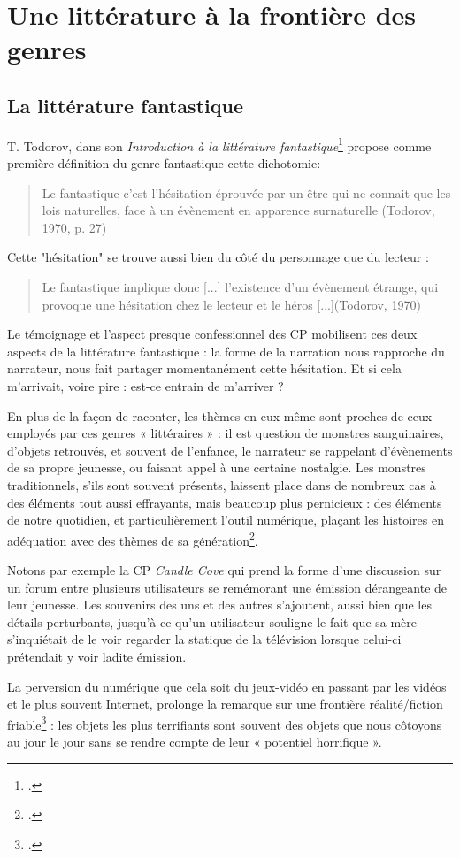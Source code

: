 \documentclass[12pt,a4paper,oneside,titlepage]{book} %
\begin{document}
\section{Une littérature à la frontière des genres}
\subsection{La littérature fantastique}

T. Todorov, dans son \emph{Introduction à la littérature fantastique}\footcite{todorov_introduction_1992} propose comme première définition du genre fantastique cette dichotomie: 

	\begin{quotation}
Le fantastique c’est l’hésitation éprouvée par un être qui ne connait que les lois naturelles, face à un évènement en apparence surnaturelle (Todorov, 1970, p. 27)\newline
	\end{quotation}

Cette "hésitation" se trouve aussi bien du côté du personnage que du lecteur : 
\begin{quotation}
	Le fantastique implique donc [...] l’existence d’un évènement étrange, qui provoque une hésitation chez le lecteur et le héros [...](Todorov, 1970)
\end{quotation}

Le témoignage et l'aspect presque confessionnel des CP mobilisent ces deux aspects de la littérature fantastique : la forme de la narration nous rapproche du narrateur, nous fait partager momentanément cette hésitation. Et si cela m'arrivait, voire pire : est-ce entrain de m'arriver ? 

\par
En plus de la façon de raconter, les thèmes en eux même sont proches de ceux employés par ces genres « littéraires » : il est question de monstres sanguinaires, d’objets retrouvés, et souvent de l’enfance, le narrateur se rappelant d’évènements de sa propre jeunesse, ou faisant appel à une certaine nostalgie. Les monstres traditionnels, s’ils sont souvent présents, laissent place dans de nombreux cas à des éléments tout aussi effrayants, mais beaucoup plus pernicieux : des éléments de notre quotidien, et particulièrement l’outil numérique, plaçant les histoires en adéquation avec des thèmes de sa génération\footcite{king_anatomie_2020}.
\par
Notons par exemple la CP \emph{Candle Cove} qui prend la forme d’une discussion sur un forum entre plusieurs utilisateurs se remémorant une émission dérangeante de leur jeunesse. Les souvenirs des uns et des autres s’ajoutent, aussi bien que les détails perturbants, jusqu’à ce qu’un utilisateur souligne le fait que sa mère s’inquiétait de le voir regarder la statique de la télévision lorsque celui-ci prétendait y voir ladite émission. 
\par
La perversion du numérique que cela soit du jeux-vidéo en passant par les vidéos et le plus souvent Internet, prolonge la remarque sur une frontière réalité/fiction friable\footcite{balanzategui_creepypasta_2019} : les objets les plus terrifiants sont souvent des objets que nous côtoyons au jour le jour sans se rendre compte de leur « potentiel horrifique ».
\par
\end{document}
